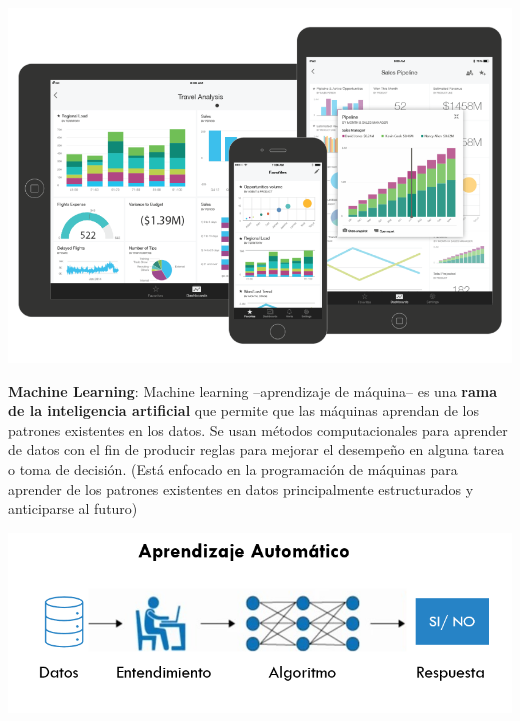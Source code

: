 \documentclass[
]{book}
\begin{document}
\begin{center}\includegraphics{img/01-intro2ds/03_bi} \end{center}

\textbf{Machine Learning}: Machine learning --aprendizaje de máquina-- es una \textbf{rama de la inteligencia artificial} que permite que las máquinas aprendan de los patrones existentes en los datos. Se usan métodos computacionales para aprender de datos con el fin de producir reglas para mejorar el desempeño en alguna tarea o toma de decisión. (Está enfocado en la programación de máquinas para aprender de los patrones existentes en datos principalmente estructurados y anticiparse al futuro)

\begin{center}\includegraphics[width=600pt]{img/01-intro2ds/04_ml} \end{center}
\end{document}
